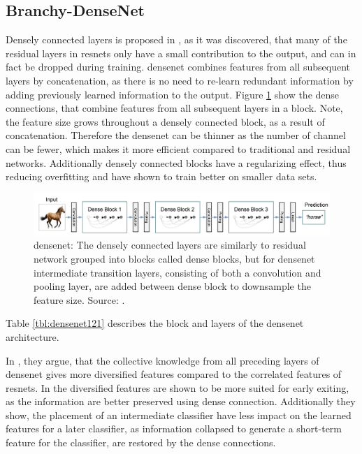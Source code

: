 \newpage\subsection{Branchy-DenseNet}

Densely connected layers is proposed in \cite{huang_densely_2016}, as it was discovered, that many of the residual layers in \gls{resnet}s only have a small contribution to the output, and can in fact be dropped during training. \gls{densenet} combines features from all subsequent layers by concatenation, as there is no need to re-learn redundant information by adding previously learned information to the output. Figure \ref{fig:densenet} show the dense connections, that combine features from all subsequent layers in a block. Note, the feature size grows throughout a densely connected block, as a result of concatenation. Therefore the \gls{densenet} can be thinner as the number of channel can be fewer, which makes it more efficient compared to traditional and residual networks. Additionally densely connected blocks have a regularizing effect, thus reducing overfitting and have shown to train better on smaller data sets.

\begin{figure}
	\centering
	\includegraphics[width=\linewidth]{figures/models/densenet}
	\caption[\gls{densenet}]{\gls{densenet}: The densely connected layers are similarly to residual network grouped into blocks called dense blocks, but for \gls{densenet} intermediate transition layers, consisting of both a convolution and pooling layer, are added between dense block to downsample the feature size. Source:  \cite{huang_densely_2016}.}
	\label{fig:densenet}
\end{figure}

Table \ref{tbl:densenet121} describes the block and layers of the \gls{densenet} architecture. 

In \cite{huang_multi-scale_2017}, they argue, that the collective knowledge from all preceding layers of \gls{densenet} gives more diversified features compared to the correlated features of \gls{resnet}s. In \cite{huang_multi-scale_2017} the diversified features are shown to be more suited for early exiting, as the information are better preserved using dense connection. Additionally they show, the placement of an intermediate classifier have less impact on the learned features for a later classifier, as information collapsed to generate a short-term feature for the classifier, are restored by the dense connections.

